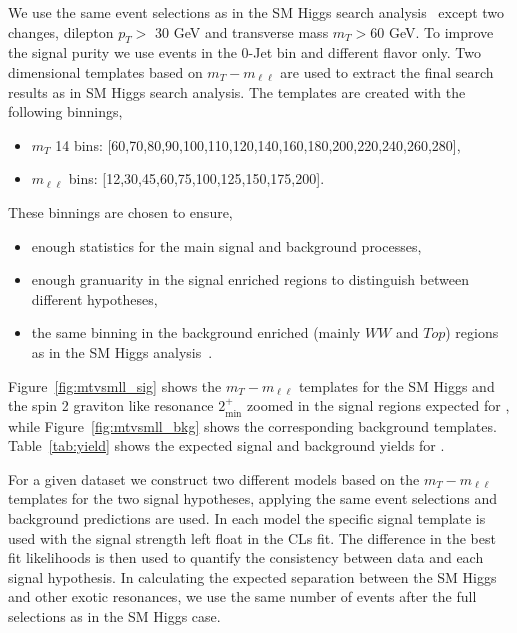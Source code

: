 We use the same event selections as in the SM Higgs search 
analysis~\cite{HWWHCP2012} except two changes, dilepton $p_T>$ 30 GeV and 
transverse mass $m_T>$60 GeV. 
To improve the signal purity 
we use events in the 0-Jet bin and different flavor only. 
Two dimensional templates based on $m_T-m_{\ell\ell}$ 
are used to extract the final search results as in SM Higgs search analysis.
The templates are created with the following binnings,
\begin{itemize}
\item $m_T$ 14 bins: [60,70,80,90,100,110,120,140,160,180,200,220,240,260,280],
\item $m_{\ell\ell}$ bins: [12,30,45,60,75,100,125,150,175,200].
\end{itemize}
These binnings are chosen to ensure, 
\begin{itemize}
\item enough statistics for the main signal and background processes, 
\item enough granuarity in the signal enriched regions to distinguish between 
different hypotheses, 
\item the same binning in the background enriched (mainly $WW$ and $Top$) regions 
as in the SM Higgs analysis~\cite{HWWHCP2012}. 
\end{itemize}
Figure~\ref{fig:mtvsmll_sig} shows the $m_T-m_{\ell\ell}$ templates for the SM Higgs 
and the spin 2 graviton like resonance $2_\text{min}^+$ zoomed in the signal regions expected for \intlumiEightTeV, while 
Figure~\ref{fig:mtvsmll_bkg} shows the corresponding background templates. 
Table~\ref{tab:yield} shows the expected signal and background yields 
for \intlumiEightTeV. 

For a given dataset we construct two different models based on the $m_T-m_{\ell\ell}$ 
templates for the two signal hypotheses, applying the 
same event selections and background predictions are used.  
In each model the specific signal template is used with the 
signal strength left float in the CLs fit. 
The difference in the best fit likelihoods is then used 
to quantify the consistency between data and each signal hypothesis. 
In calculating the expected separation between the SM Higgs and other 
exotic resonances, we use the same number of events after the full selections as in 
the SM Higgs case. 

